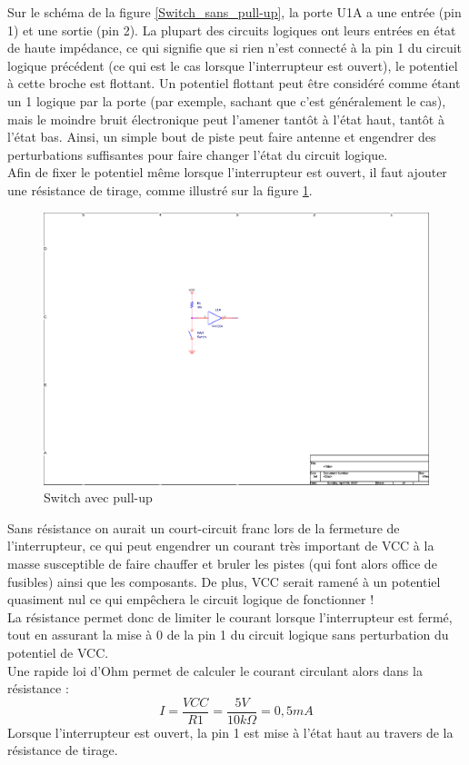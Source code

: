 \documentclass[a4paper]{article}
\begin{document}
Sur le schéma de la figure \ref{Switch_sans_pull-up}, la porte U1A a une entrée (pin 1) et une sortie (pin 2). La plupart des circuits logiques ont leurs entrées en état de haute impédance, ce qui signifie que si rien n'est connecté à la pin 1 du circuit logique précédent (ce qui est le cas lorsque l'interrupteur est ouvert), le potentiel à cette broche est flottant. Un potentiel flottant peut être considéré comme étant un 1 logique par la porte (par exemple, sachant que c'est généralement le cas), mais le moindre bruit électronique peut l'amener tantôt à l'état haut, tantôt à l'état bas. Ainsi, un simple bout de piste peut faire antenne et engendrer des perturbations suffisantes pour faire changer l'état du circuit logique.\\
Afin de fixer le potentiel même lorsque l'interrupteur est ouvert, il faut ajouter une résistance de tirage, comme illustré sur la figure \ref{Switch_avec_pull-up}.

\begin{figure}[H]
	\centering
	\includegraphics[scale=1.00]{Images/Switch_avec_pull-up}
	\caption{Switch avec pull-up
		\label{Switch_avec_pull-up}}
\end{figure}

Sans résistance on aurait un court-circuit franc lors de la fermeture de l'interrupteur, ce qui peut engendrer un courant très important de VCC à la masse susceptible de faire chauffer et bruler les pistes (qui font alors office de fusibles) ainsi que les composants. De plus, VCC serait ramené à un potentiel quasiment nul ce qui empêchera le circuit logique de fonctionner !\\
La résistance permet donc de limiter le courant lorsque l'interrupteur est fermé, tout en assurant la mise à 0 de la pin 1 du circuit logique sans perturbation du potentiel de VCC.\\
Une rapide loi d'Ohm permet de calculer le courant circulant alors dans la résistance :
\[I = \frac{VCC}{R1} = \frac{5 V}{10 k\Omega} = 0,5 mA\]
Lorsque l'interrupteur est ouvert, la pin 1 est mise à l'état haut au travers de la résistance de tirage.
\end{document}
